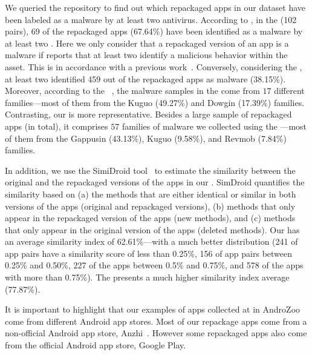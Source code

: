 We queried the \vt repository to find out which repackaged apps in our
dataset have been labeled as a malware by at least two antivirus. According to \vt, in the \sds (102 pairs),
69 of the repackaged apps (67.64\%) have been identified as a malware by at least two
\ses. Here we only consider that a repackaged version of an app is a malware if \vt reports that at least
two \ses identify a malicious behavior within the asset. This is in accordance with a previous work~\cite{vt-label}. Conversely, considering the \cds, at least two \se identified 459 out of the \apps repackaged apps as malware (38.15\%).
Moreover, according to the
\avt~\cite{avclass2-paper}, the malware samples in the \sds come from $17$ different families---most of them from the Kuguo (49.27\%) and Dowgin (17.39\%) families.
Contrasting, our \cds is more representative. Besides a large sample of repackaged apps (\apps in total), it
comprises $57$ families of malware we collected using the \avt ---most
of them from the Gappusin (43.13\%), Kuguo (9.58\%), and Revmob (7.84\%) families.

In addition, we use the SimiDroid tool~\cite{DBLP:conf/trustcom/0029BK17} to
estimate the similarity between the original and the repackaged versions of the
apps in our \cds. SimDroid quantifies the similarity
based on (a) the methods that are either identical or similar in both versions of the apps (original and repackaged versions),
(b) methods that only appear in the repackaged version of the apps (new methods), and (c) methods that only appear in the
original version of the apps (deleted methods).
Our \cds has an average similarity index of 62.61\%---with a much better distribution (241 of
app pairs have a similarity score of less than 0.25\%, 156 of app pairs
between 0.25\% and 0.50\%, 227 of the apps between 0.5\% and 0.75\%,
and 578 of the apps with more than 0.75\%). The \sds presents a much higher
similarity index average (77.87\%). 

It is important to highlight that our examples of apps collected at in AndroZoo come from different Android app stores. Most of our repackage apps come from a non-official Android app store, Anzhi~\cite{anzhi}. However some repackaged apps also come from the official Android app store, Google Play.




